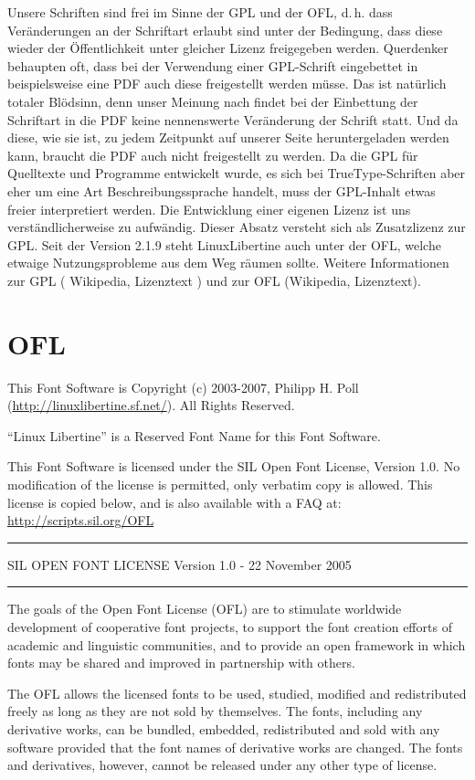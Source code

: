 \documentclass{fontdokuold}
\begin{document}
Unsere Schriften sind frei im Sinne der GPL und der OFL, d.\,h. dass
Veränderungen an der Schriftart erlaubt sind unter der Bedingung, dass diese
wieder der Öffentlichkeit unter gleicher Lizenz freigegeben werden. Querdenker
behaupten oft, dass bei der Verwendung einer GPL-Schrift eingebettet in
beispielsweise eine PDF auch diese freigestellt werden müsse. Das ist natürlich
totaler Blödsinn, denn unser Meinung nach findet bei der Einbettung der
Schriftart in die PDF keine nennenswerte Veränderung der Schrift statt. Und da
diese, wie sie ist, zu jedem Zeitpunkt auf unserer Seite heruntergeladen werden
kann, braucht die PDF auch nicht freigestellt zu werden. Da die GPL für
Quelltexte und Programme entwickelt wurde, es sich bei TrueType-Schriften aber
eher um eine Art Beschreibungssprache handelt, muss der GPL-Inhalt etwas freier
interpretiert werden. Die Entwicklung einer eigenen Lizenz ist uns
verständlicherweise zu aufwändig. Dieser Absatz versteht sich als Zusatzlizenz
zur GPL. Seit der Version 2.1.9 steht LinuxLibertine auch unter der OFL, welche
etwaige Nutzungsprobleme aus dem Weg räumen sollte. Weitere Informationen zur
GPL ( Wikipedia, Lizenztext ) und zur OFL (Wikipedia, Lizenztext).


\section{OFL}

This Font Software is Copyright (c) 2003-2007, Philipp H. Poll (\url{http://linuxlibertine.sf.net/}).
All Rights Reserved.

"`Linux Libertine"' is a Reserved Font Name for this Font Software.

This Font Software is licensed under the SIL Open Font License, Version 1.0.
No modification of the license is permitted, only verbatim copy is allowed.
This license is copied below, and is also available with a FAQ at:
\url{http://scripts.sil.org/OFL}
\bigskip

\hrule\bigskip
SIL OPEN FONT LICENSE Version 1.0 - 22 November 2005\bigskip
\hrule\bigskip


The goals of the Open Font License (OFL) are to stimulate worldwide
development of cooperative font projects, to support the font creation
efforts of academic and linguistic communities, and to provide an open
framework in which fonts may be shared and improved in partnership with
others.

The OFL allows the licensed fonts to be used, studied, modified and
redistributed freely as long as they are not sold by themselves. The
fonts, including any derivative works, can be bundled, embedded,
redistributed and sold with any software provided that the font
names of derivative works are changed. The fonts and derivatives,
however, cannot be released under any other type of license.
\end{document}

